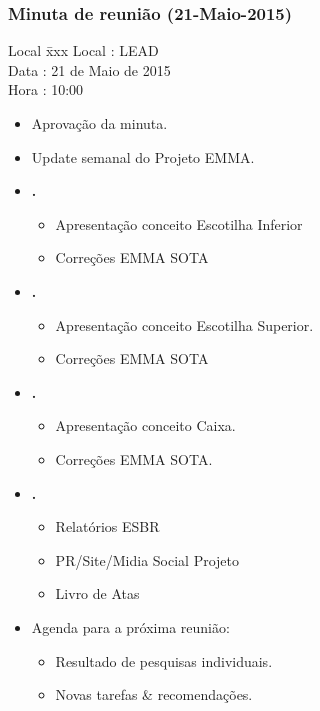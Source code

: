 \subsubsection{Minuta de reunião (21-Maio-2015)}

\begin{tabbing}
  Local \= xxx \kill
  Local \> : LEAD \\
  Data  \> : 21 de Maio de 2015 \\
  Hora  \> : 10:00
\end{tabbing}


  
\begin{itemize}
  \item Aprovação da minuta.

  \item Update semanal do Projeto EMMA.
  
  
    \item \textbf{\renan.} 
		\begin{itemize}    
			 \item Apresentação conceito Escotilha Inferior
			 \item Correções EMMA SOTA 
			
		\end{itemize}
		
		
    \item \textbf{\elael.} 
    		\begin{itemize}    
			 \item Apresentação conceito Escotilha Superior. 
			 \item Correções EMMA SOTA 
			\end{itemize}
					
			
    \item \textbf{\gabriel.} 
    		\begin{itemize}    
		 \item Apresentação conceito Caixa. 
		 \item Correções EMMA SOTA. 
			\end{itemize}

		 \item \textbf{\julia.} 
    		\begin{itemize}    
			 \item Relatórios ESBR
			 \item PR/Site/Midia Social Projeto
			 \item Livro de Atas
		
			\end{itemize}


  \item Agenda para a próxima reunião:
  \begin{itemize}
    \item Resultado de pesquisas individuais.
    \item Novas tarefas \& recomendações.
  \end{itemize}

\end{itemize}

